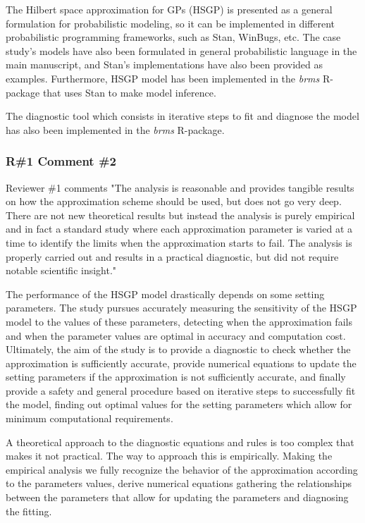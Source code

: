 \documentclass[11pt]{report}
\begin{document}
The Hilbert space approximation for GPs (HSGP) is presented as a general formulation for probabilistic modeling, so it can be implemented in different probabilistic programming frameworks, such as Stan, WinBugs, etc. The case study's models have also been formulated in general probabilistic language in the main manuscript, and Stan's implementations have also been provided as examples. Furthermore, HSGP model has been implemented in the \textit{brms} R-package that uses Stan to make model inference.

The diagnostic tool which consists in iterative steps to fit and diagnose the model has also been implemented in the \textit{brms} R-package. 

\subsubsection*{R\#1 Comment \#2}

Reviewer \#1 comments "The analysis is reasonable and provides tangible results on how the approximation scheme should be used, but does not go very deep. There are not new theoretical results but instead the analysis is purely empirical and in fact a standard study where each approximation parameter is varied at a time to identify the limits when the approximation starts to fail. The analysis is properly carried out and results in a practical diagnostic, but did not require notable scientific insight."

The performance of the HSGP model drastically depends on some setting parameters. The study pursues accurately measuring the sensitivity of the HSGP model to the values of these parameters, detecting when the approximation fails and when the parameter values are optimal in accuracy and computation cost. Ultimately, the aim of the study is to provide a diagnostic to check whether the approximation is sufficiently accurate, provide numerical equations to update the setting parameters if the approximation is not sufficiently accurate, and finally provide a safety and general procedure based on iterative steps to successfully fit the model, finding out optimal values for the setting parameters which allow for minimum computational requirements.

A theoretical approach to the diagnostic equations and rules is too complex that makes it not practical. The way to approach this is empirically. Making the empirical analysis we fully recognize the behavior of the approximation according to the parameters values, derive numerical equations gathering the relationships between the parameters that allow for updating the parameters and diagnosing the fitting.
\end{document}
